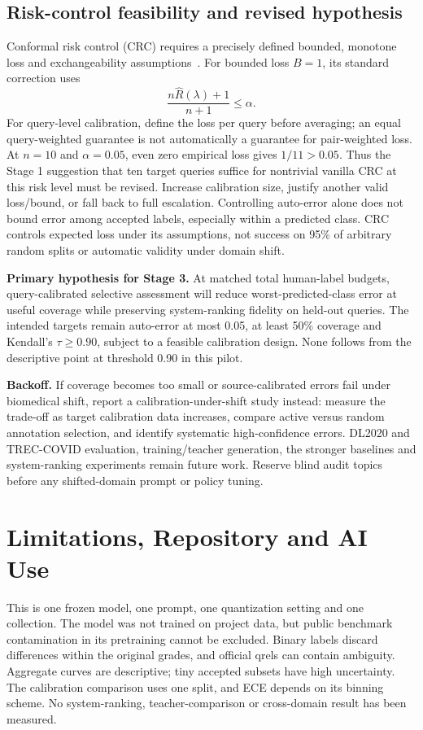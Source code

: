 \documentclass[11pt,a4paper]{article}
\begin{document}
\subsection{Risk-control feasibility and revised hypothesis}
Conformal risk control (CRC) requires a precisely defined bounded, monotone loss
and exchangeability assumptions~\cite{crc}. For bounded loss $B=1$, its standard
correction uses
\[
\frac{n\widehat R(\lambda)+1}{n+1}\leq\alpha.
\]
For query-level calibration, define the loss per query before averaging; an equal
query-weighted guarantee is not automatically a guarantee for pair-weighted loss.
At $n=10$ and $\alpha=0.05$, even zero empirical loss gives $1/11>0.05$.
Thus the Stage 1 suggestion that ten target queries suffice for nontrivial vanilla
CRC at this risk level must be revised. Increase calibration size, justify another
valid loss/bound, or fall back to full escalation. Controlling auto-error alone
does not bound error among accepted labels, especially within a predicted class.
CRC controls expected loss under its assumptions, not success on 95\% of arbitrary
random splits or automatic validity under domain shift.

\textbf{Primary hypothesis for Stage 3.} At matched total human-label budgets,
query-calibrated selective assessment will reduce worst-predicted-class error at
useful coverage while preserving system-ranking fidelity on held-out queries.
The intended targets remain auto-error at most 0.05, at least 50\% coverage and
Kendall's $\tau\geq0.90$, subject to a feasible calibration design. None follows
from the descriptive point at threshold 0.90 in this pilot.

\textbf{Backoff.} If coverage becomes too small or source-calibrated errors fail
under biomedical shift, report a calibration-under-shift study instead: measure
the trade-off as target calibration data increases, compare active versus random
annotation selection, and identify systematic high-confidence errors. DL2020 and
TREC-COVID evaluation, training/teacher generation, the stronger baselines and
system-ranking experiments remain future work. Reserve blind audit topics before
any shifted-domain prompt or policy tuning.

\section{Limitations, Repository and AI Use}
This is one frozen model, one prompt, one quantization setting and one collection.
The model was not trained on project data, but public benchmark contamination in
its pretraining cannot be excluded. Binary labels discard differences within the
original grades, and official qrels can contain ambiguity. Aggregate curves are
descriptive; tiny accepted subsets have high uncertainty. The calibration comparison
uses one split, and ECE depends on its binning scheme. No system-ranking,
teacher-comparison or cross-domain result has been measured.
\end{document}
